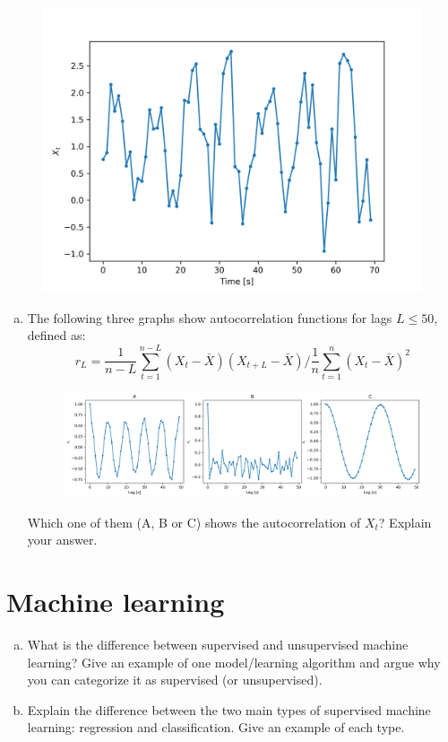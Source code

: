 \documentclass[12pt]{article}
\begin{document}
\begin{figure}[h!]
    \centering
    \includegraphics[width=.8\textwidth]{autocorrelation_y} 
\end{figure}


\begin{enumerate}[(a)]
\item The following three graphs show autocorrelation functions for lags $L \le 50$, defined as:
$$ r_L = \frac{1}{n-L} \sum_{t=1}^{n-L} (X_t-\bar{X}) (X_{t+L} - \bar{X}) / \frac{1}{n} \sum_{t=1}^n (X_t-\bar{X})^2$$

\begin{figure}[h!]
    \centering
    \includegraphics[width=.8\textwidth]{autocorrelation_rl} 
\end{figure}
Which one of them (A, B or C) shows the autocorrelation of $X_t$? Explain your answer.

\end{enumerate}



\pagebreak
\section{Machine learning}
\begin{enumerate}[(a)] 
\item What is the difference between supervised and unsupervised machine learning? Give an example of one model/learning algorithm and argue why you can categorize it as supervised (or unsupervised).
\item Explain the difference between the two main types of supervised machine learning: regression and classification. Give an example of each type.
\end{enumerate}
\end{document}
